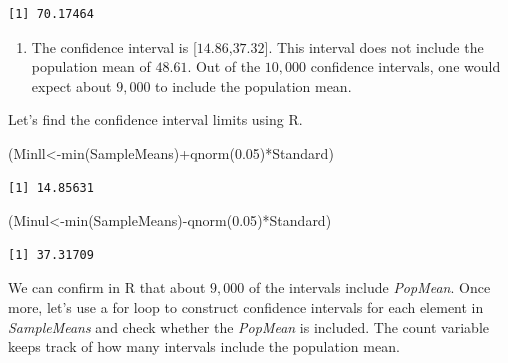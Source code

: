 \documentclass[
  letterpaper,
  DIV=11,
  numbers=noendperiod]{scrreprt}
\newenvironment{Shaded}{\begin{snugshade}}{\end{snugshade}}
\newcommand{\FloatTok}[1]{\textcolor[rgb]{0.68,0.00,0.00}{#1}}
\newcommand{\FunctionTok}[1]{\textcolor[rgb]{0.28,0.35,0.67}{#1}}
\newcommand{\NormalTok}[1]{\textcolor[rgb]{0.00,0.23,0.31}{#1}}
\newcommand{\OtherTok}[1]{\textcolor[rgb]{0.00,0.23,0.31}{#1}}
\newcommand{\SpecialCharTok}[1]{\textcolor[rgb]{0.37,0.37,0.37}{#1}}
\providecommand{\tightlist}{%
  \setlength{\itemsep}{0pt}\setlength{\parskip}{0pt}}\usepackage{longtable,booktabs,array}
\begin{document}
\begin{verbatim}
[1] 70.17464
\end{verbatim}

\begin{enumerate}
\def\labelenumi{\arabic{enumi}.}
\setcounter{enumi}{3}
\tightlist
\item
  The confidence interval is {[}\(14.86\),\(37.32\){]}. This interval
  does not include the population mean of \(48.61\). Out of the
  \(10,000\) confidence intervals, one would expect about \(9,000\) to
  include the population mean.
\end{enumerate}

Let's find the confidence interval limits using R.

\begin{Shaded}
\begin{Highlighting}[numbers=left,,]
\NormalTok{(Minll}\OtherTok{\textless{}{-}}\FunctionTok{min}\NormalTok{(SampleMeans)}\SpecialCharTok{+}\FunctionTok{qnorm}\NormalTok{(}\FloatTok{0.05}\NormalTok{)}\SpecialCharTok{*}\NormalTok{Standard)}
\end{Highlighting}
\end{Shaded}

\begin{verbatim}
[1] 14.85631
\end{verbatim}

\begin{Shaded}
\begin{Highlighting}[numbers=left,,]
\NormalTok{(Minul}\OtherTok{\textless{}{-}}\FunctionTok{min}\NormalTok{(SampleMeans)}\SpecialCharTok{{-}}\FunctionTok{qnorm}\NormalTok{(}\FloatTok{0.05}\NormalTok{)}\SpecialCharTok{*}\NormalTok{Standard)}
\end{Highlighting}
\end{Shaded}

\begin{verbatim}
[1] 37.31709
\end{verbatim}

We can confirm in R that about \(9,000\) of the intervals include
\emph{PopMean}. Once more, let's use a for loop to construct confidence
intervals for each element in \emph{SampleMeans} and check whether the
\emph{PopMean} is included. The count variable keeps track of how many
intervals include the population mean.
\end{document}
